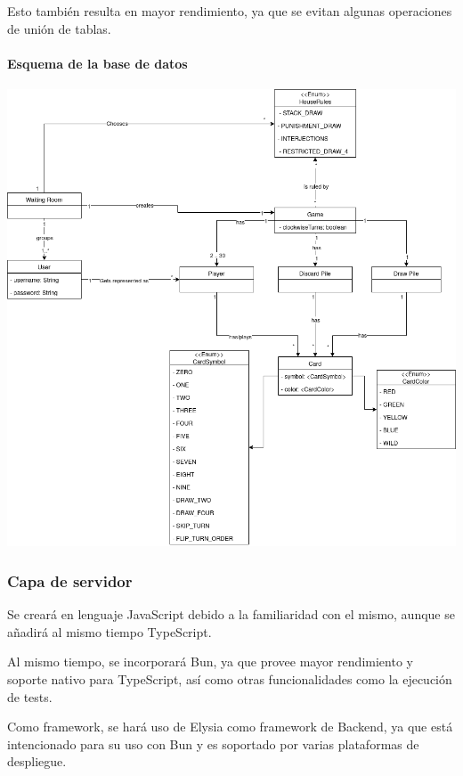 Esto también resulta en mayor rendimiento, ya que se evitan algunas operaciones de unión de tablas.

\paragraph{Esquema de la base de datos}

\begin{center}
  \includegraphics[width=1\textwidth]{img/BD_drawio.png}
   \label{fig:dbschema}
\end{center}

\subsubsection{Capa de servidor}
Se creará en lenguaje JavaScript debido a la familiaridad con el mismo, aunque se añadirá al mismo tiempo TypeScript. 

Al mismo tiempo, se incorporará Bun,
ya que provee mayor rendimiento y soporte nativo para TypeScript,
así como otras funcionalidades como la ejecución de tests. 

Como framework, se hará uso de Elysia como framework de Backend, ya que está intencionado para su uso con Bun
y es soportado por varias plataformas de despliegue. 

